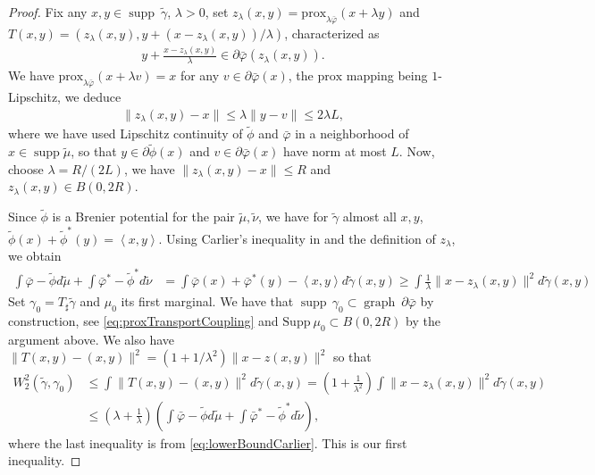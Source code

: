 \documentclass[11pt]{article}
\DeclareMathOperator{\supp}{supp}
\DeclareMathOperator{\graph}{graph}
\newcommand{\1}{\mathbbm{1}}
\newcommand{\prox}{\mathrm{prox}}
\numberwithin{equation}{section}
\begin{document}
\begin{proof}
    Fix any $x,y \in \supp\ \tilde{\gamma}$, $\lambda>0$, set $z_\lambda(x,y) = \prox_{\lambda\bar{\varphi}} (x+\lambda y)$ and $T(x,y) = (z_\lambda(x,y), y+ (x -z_\lambda(x,y))/\lambda)$, characterized as
    \begin{align}
    	y+\frac{x- z_\lambda(x,y)}{\lambda}  \in\partial \bar{\varphi} (z_\lambda(x,y)).
        \label{eq:proxTransportCoupling}
    \end{align}
    We have $\prox_{\lambda \bar{\varphi}}(x + \lambda v) = x$ for any $v \in \partial \bar{\varphi}(x)$, the $\prox$ mapping being $1$-Lipschitz, we deduce
    \begin{align*}
    	\|z_\lambda(x,y) - x \| \leq \lambda \| y -v \|\leq 2 \lambda L,
    \end{align*}
    where we have used Lipschitz continuity of $\tilde{\phi}$ and $\bar{\varphi}$ in a neighborhood of $x \in \supp \tilde \mu$, so that $y \in \partial \tilde{\phi}(x)$ and $v \in \partial \bar{\varphi}(x)$ have norm at most $L$.
    Now, choose $\lambda = R / (2L)$, we have $\|z_\lambda(x,y) - x \|\leq R$ and $z_\lambda(x,y) \in B(0,2R)$.
    
    
    Since $\tilde{\phi}$ is a Brenier potential for the pair $\tilde{\mu},\tilde{\nu}$, we have for $\tilde{\gamma}$ almost all $x,y$, $\tilde{\phi}(x) + \tilde{\phi}^*(y) = \left\langle x, y \right\rangle$. Using Carlier's inequality in  and the definition of $z_\lambda$, we obtain
    \begin{align}
    	\int \bar{\varphi} - \tilde{\phi} d\tilde{\mu} + \int \bar{\varphi}^* - \tilde{\phi}^* d\tilde{\nu} 
    	& =\int \bar{\varphi}(x) + \bar{\varphi}^*(y)- \left\langle x, y \right\rangle d \tilde{\gamma}(x,y) \geq\int \frac{1}{\lambda}\|x-z_\lambda (x,y)\|^2 d\tilde{\gamma}(x,y)
        \label{eq:lowerBoundCarlier}
    \end{align}
    Set $\gamma_0 = T_\sharp \tilde{\gamma}$ and $\mu_0$ its first marginal. We have that $\supp\, \gamma_0 \subset  \graph \ \partial \bar{\varphi}$ by construction, see \eqref{eq:proxTransportCoupling} and $\mathrm{Supp}\ \mu_0 \subset B(0,2R)$ by the argument above. We also have $\|T(x,y) - (x,y)\|^2 = (1 + 1 / \lambda^2) \|x - z(x,y)\|^2$ so that
    \begin{align*}
    	W_2^2(\tilde{\gamma}, \gamma_0) &\leq  \int \|T(x,y) - (x,y)\|^2 d\tilde{\gamma}(x,y) = \left( 1 + \frac{1}{\lambda^2} \right)\int \|x - z_\lambda(x,y)\|^2 d\tilde{\gamma}(x,y)\\
    	&\leq \left( \lambda + \frac{1}{\lambda} \right) \left(\int \bar{\varphi} - \tilde{\phi} d\tilde{\mu} + \int \bar{\varphi}^* - \tilde{\phi}^* d\tilde{\nu}\right),
    \end{align*}
    where the last inequality is from \eqref{eq:lowerBoundCarlier}.
    This is our first inequality.
    

\end{proof}
\end{document}
